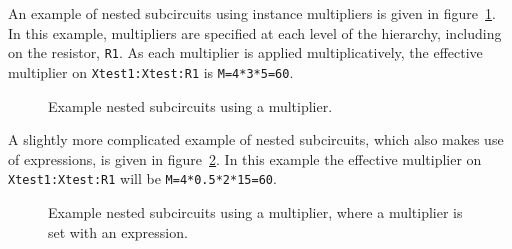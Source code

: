 An example of nested subcircuits using instance multipliers is given in 
figure~\ref{Subcircuit_Multiplier_Example_2}.  In this example, multipliers are
specified at each level of the hierarchy, including on the resistor, \texttt{R1}.  
As each multiplier is applied multiplicatively, the effective multiplier on 
\texttt{Xtest1:Xtest:R1} is \texttt{M=4*3*5=60}.
\begin{figure}[H]
\begin{centering}
\caption{Example nested subcircuits using a multiplier.\label{Subcircuit_Multiplier_Example_2}}
\end{centering}
\end{figure}

A slightly more complicated example of nested subcircuits, which also makes use of expressions, 
is given in figure~\ref{Subcircuit_Multiplier_Example_3}.  In this example the effective multiplier
on \texttt{Xtest1:Xtest:R1} will be \texttt{M=4*0.5*2*15=60}.
\begin{figure}[H]
\begin{centering}
\caption{Example nested subcircuits using a multiplier, where a multiplier is set with an expression.\label{Subcircuit_Multiplier_Example_3}}
\end{centering}
\end{figure}

